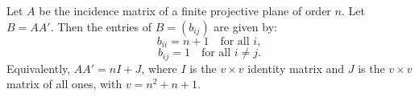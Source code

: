 Let $A$ be the incidence matrix of a finite projective plane of order $n$. Let $B = AA'$. Then the entries of $B = (b_{ij})$ are given by:
$$b_{ii} = n + 1 \quad \text{for all } i,$$
$$b_{ij} = 1 \quad \text{for all } i \neq j.$$
Equivalently, $AA' = nI + J$, where $I$ is the $v \times v$ identity matrix and $J$ is the $v \times v$ matrix of all ones, with $v = n^2 + n + 1$.

